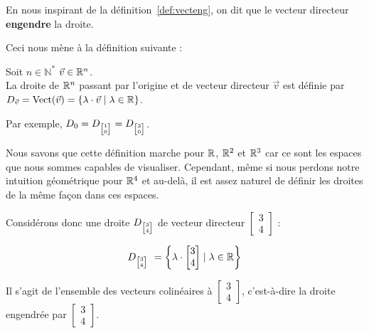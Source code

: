 En nous inspirant de la définition~\ref{def:vecteng}, on dit que le vecteur directeur \textbf{engendre} la droite.

Ceci nous mène à la définition suivante :

\begin{boxdef}
 Soit $n \in \mathbb{N}^*$ $\vec{v} \in \mathbb{R}^n$.\\
 La droite de $\mathbb{R}^n$ passant par l'origine et de vecteur directeur $\vec{v}$ est définie par $D_{\vec{v}} = \operatorname{Vect}(\vec{v}) = \left\{\lambda \cdot \vec{v} \mid \lambda \in \mathbb{R} \right\}$.
\end{boxdef}

Par exemple, $D_0 = D_{\tiny \begin{bmatrix}1\\0\end{bmatrix}} = D_{\tiny \begin{bmatrix}3\\0\end{bmatrix}}$.

Nous savons que cette définition marche pour $\mathbb{R}$, $\mathbb{R}^2$ et $\mathbb{R}^3$ car ce sont les espaces que nous sommes capables de visualiser. Cependant, même si nous perdons notre intuition géométrique pour $\mathbb{R}^4$ et au-delà, il est assez naturel de définir les droites de la même façon dans ces espaces.

Considérons donc une droite $D_{\tiny \begin{bmatrix} 3\\4\end{bmatrix}}$ de vecteur directeur $\begin{bmatrix} 3\\4\end{bmatrix}$ :

\[
D_{\tiny \begin{bmatrix} 3\\4\end{bmatrix}}\ = \left\{ \lambda \cdot \begin{bmatrix} 3\\4\end{bmatrix} \mid \lambda \in \mathbb{R} \right\}
\]

Il s'agit de l'ensemble des vecteurs colinéaires à $\begin{bmatrix} 3\\4\end{bmatrix}$, c'est-à-dire la droite engendrée par $\begin{bmatrix} 3\\4\end{bmatrix}$.

